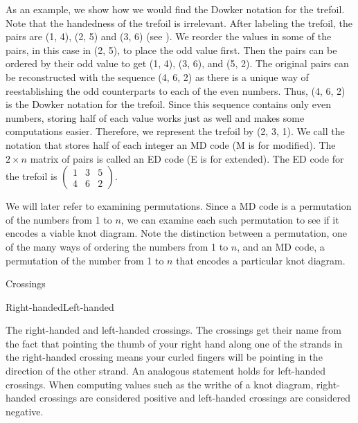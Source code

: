 \begin{paper}
As an example, we show how we would find the Dowker notation for the trefoil.
Note that the handedness of the trefoil is irrelevant.
After labeling the trefoil, the pairs are (1, 4), (2, 5) and (3, 6) (see
\figLabeled).
We reorder the values in some of the pairs, in this case in (2, 5), to place the
odd value first.
Then the pairs can be ordered by their odd value to get (1, 4), (3, 6), and
(5, 2).
The original pairs can be reconstructed with the sequence (4, 6, 2) as there is
a unique way of reestablishing the odd counterparts to each of the even numbers.
Thus, (4, 6, 2) is the Dowker notation for the trefoil.
Since this sequence contains only even numbers, storing half of each value works
just as well and makes some computations easier.
Therefore, we represent the trefoil by (2, 3, 1).
We call the notation that stores half of each integer an MD code (M is for
modified).
The $2\times n$ matrix of pairs is called an ED code (E is for extended).
The ED code for the trefoil is $\begin{pmatrix}1&3&5\\4&6&2\end{pmatrix}$.

We will later refer to examining permutations.
Since a MD code is a permutation of the numbers from 1 to $n$, we can examine
each such permutation to see if it encodes a viable knot diagram.
Note the distinction between a permutation, one of the many ways of ordering the
numbers from 1 to $n$, and an MD code, a permutation of the number from 1 to $n$
that encodes a particular knot diagram.\\

{\begin{center}Crossings\end{center}\vspace{-1em}
\hfill
{}\vspace{-0.5em}
\begin{center}Right-handed\hspace{0.37\columnwidth}Left-handed\end{center}
\vspace{-1em}}
{The right-handed and left-handed crossings.
The crossings get their name from the fact that pointing the thumb of your right
hand along one of the strands in the right-handed crossing means your curled
fingers will be pointing in the direction of the other strand.
An analogous statement holds for left-handed crossings.
When computing values such as the writhe of a knot diagram, right-handed
crossings are considered positive and left-handed crossings are considered
negative.}


\end{paper}
